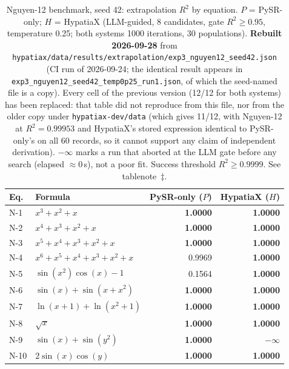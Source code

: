 \documentclass[twoside,11pt]{article}
\newcommand{\Rsq}{R^{2}}
\begin{document}
\begin{table}[h]
\centering
\caption{Nguyen-12 benchmark, seed 42: extrapolation $\Rsq$ by equation.
$P$ = PySR-only; $H$ = HypatiaX (LLM-guided, 8 candidates, gate $\Rsq\ge0.95$,
temperature 0.25; both systems 1000 iterations, 30 populations).
\textbf{Rebuilt 2026-09-28} from
\texttt{hypatiax/data/results/extrapolation/exp3\_nguyen12\_seed42.json}
(CI run of 2026-09-24; the identical result appears in
\texttt{exp3\_nguyen12\_seed42\_temp0p25\_run1.json}, of which the seed-named file is a copy). Every cell of the
previous version (12/12 for both systems) has been replaced: that table did not
reproduce from this file, nor from the older copy under
\texttt{hypatiax-dev/data} (which gives 11/12, with
Nguyen-12 at $\Rsq=0.99953$ and HypatiaX's stored expression identical to
PySR-only's on all 60 records, so it cannot support any claim of independent
derivation). $-\infty$ marks a run that aborted at the LLM gate before any
search (elapsed $\approx0$\,s), not a poor fit. Success threshold
$\Rsq\ge0.9999$. See tablenote~$\ddag$.}
\label{tab:nguyen12}
\begin{threeparttable}
\begin{tabular}{llrr}
\toprule
Eq. & Formula & PySR-only ($P$) & HypatiaX ($H$) \\
\midrule
N-1  & $x^3 + x^2 + x$                              & \textbf{1.0000} & \textbf{1.0000} \\
N-2  & $x^4 + x^3 + x^2 + x$                         & \textbf{1.0000} & \textbf{1.0000} \\
N-3  & $x^5 + x^4 + x^3 + x^2 + x$                   & \textbf{1.0000} & \textbf{1.0000} \\
N-4  & $x^6 + x^5 + x^4 + x^3 + x^2 + x$              & 0.9969          & \textbf{1.0000} \\
N-5  & $\sin(x^2)\cos(x)-1$                          & 0.1564          & \textbf{1.0000} \\
N-6  & $\sin(x)+\sin(x+x^2)$                         & \textbf{1.0000} & \textbf{1.0000} \\
N-7  & $\ln(x+1)+\ln(x^2+1)$                         & \textbf{1.0000} & \textbf{1.0000} \\
N-8  & $\sqrt{x}$                                    & \textbf{1.0000} & \textbf{1.0000} \\
N-9  & $\sin(x)+\sin(y^2)$                           & \textbf{1.0000} & $-\infty$ \\
N-10 & $2\sin(x)\cos(y)$                             & \textbf{1.0000} & \textbf{1.0000} \\

\end{tabular}
\end{threeparttable}
\end{table}
\end{document}
